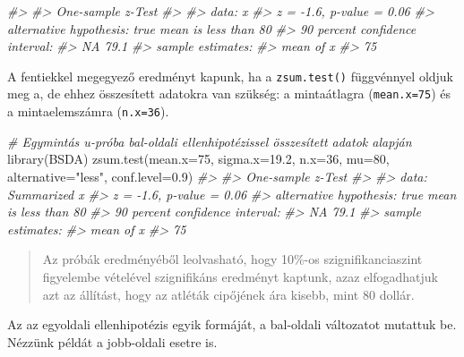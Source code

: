 \documentclass[
]{book}
\newenvironment{Shaded}{\begin{snugshade}}{\end{snugshade}}
\newcommand{\AttributeTok}[1]{\textcolor[rgb]{0.77,0.63,0.00}{#1}}
\newcommand{\CommentTok}[1]{\textcolor[rgb]{0.56,0.35,0.01}{\textit{#1}}}
\newcommand{\DecValTok}[1]{\textcolor[rgb]{0.00,0.00,0.81}{#1}}
\newcommand{\FloatTok}[1]{\textcolor[rgb]{0.00,0.00,0.81}{#1}}
\newcommand{\FunctionTok}[1]{\textcolor[rgb]{0.00,0.00,0.00}{#1}}
\newcommand{\NormalTok}[1]{#1}
\newcommand{\StringTok}[1]{\textcolor[rgb]{0.31,0.60,0.02}{#1}}
\begin{document}
\begin{Shaded}
\begin{Highlighting}[]
\CommentTok{\#\textgreater{} }
\CommentTok{\#\textgreater{}  One{-}sample z{-}Test}
\CommentTok{\#\textgreater{} }
\CommentTok{\#\textgreater{} data:  x}
\CommentTok{\#\textgreater{} z = {-}1.6, p{-}value = 0.06}
\CommentTok{\#\textgreater{} alternative hypothesis: true mean is less than 80}
\CommentTok{\#\textgreater{} 90 percent confidence interval:}
\CommentTok{\#\textgreater{}    NA 79.1}
\CommentTok{\#\textgreater{} sample estimates:}
\CommentTok{\#\textgreater{} mean of x }
\CommentTok{\#\textgreater{}        75}
\end{Highlighting}
\end{Shaded}

A fentiekkel megegyező eredményt kapunk, ha a \texttt{zsum.test()} függvénnyel oldjuk meg a, de ehhez összesített adatokra van szükség: a mintaátlagra (\texttt{mean.x=75}) és a mintaelemszámra (\texttt{n.x=36}).

\begin{Shaded}
\begin{Highlighting}[]
\CommentTok{\# Egymintás u{-}próba bal{-}oldali ellenhipotézissel összesített adatok alapján}
\FunctionTok{library}\NormalTok{(BSDA)}
\FunctionTok{zsum.test}\NormalTok{(}\AttributeTok{mean.x=}\DecValTok{75}\NormalTok{, }\AttributeTok{sigma.x=}\FloatTok{19.2}\NormalTok{, }\AttributeTok{n.x=}\DecValTok{36}\NormalTok{, }\AttributeTok{mu=}\DecValTok{80}\NormalTok{, }\AttributeTok{alternative=}\StringTok{"less"}\NormalTok{, }\AttributeTok{conf.level=}\FloatTok{0.9}\NormalTok{)  }
\CommentTok{\#\textgreater{} }
\CommentTok{\#\textgreater{}  One{-}sample z{-}Test}
\CommentTok{\#\textgreater{} }
\CommentTok{\#\textgreater{} data:  Summarized x}
\CommentTok{\#\textgreater{} z = {-}1.6, p{-}value = 0.06}
\CommentTok{\#\textgreater{} alternative hypothesis: true mean is less than 80}
\CommentTok{\#\textgreater{} 90 percent confidence interval:}
\CommentTok{\#\textgreater{}    NA 79.1}
\CommentTok{\#\textgreater{} sample estimates:}
\CommentTok{\#\textgreater{} mean of x }
\CommentTok{\#\textgreater{}        75}
\end{Highlighting}
\end{Shaded}

\begin{quote}
Az próbák eredményéből leolvasható, hogy 10\%-os szignifikanciaszint figyelembe vételével szignifikáns eredményt kaptunk, azaz elfogadhatjuk azt az állítást, hogy az atléták cipőjének ára kisebb, mint 80 dollár.
\end{quote}

Az az egyoldali ellenhipotézis egyik formáját, a bal-oldali változatot mutattuk be. Nézzünk példát a jobb-oldali esetre is.
\end{document}
